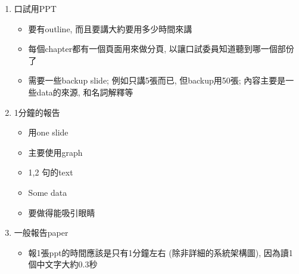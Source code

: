 
\begin{enumerate}
  \item
  {
    口試用PPT
    \begin{itemize}
      \item
      {
        要有outline, 而且要講大約要用多少時間來講
      } %

      \item
      {
        每個chapter都有一個頁面用來做分頁, 以讓口試委員知道聽到哪一個部份了
      } %

      \item
      {
        需要一些backup slide; 例如只講5張而已, 但backup用50張; 內容主要是一些data的來源, 和名詞解釋等
      } %
    \end{itemize}
  } %

  \item
  {
      1分鐘的報告
    \begin{itemize}
      \item
      {
        用one slide
      } %

      \item
      {
        主要使用graph
      } %

      \item
      {
        1,2 句的text
      } %

      \item
      {
        Some data
      } %

      \item
      {
        要做得能吸引眼睛
      } %
    \end{itemize}
  } %

  \item
  {
    一般報告paper
    \begin{itemize}
      \item
      {
        報1張ppt的時間應該是只有1分鐘左右 (除非詳細的系統架構圖), 因為讀1個中文字大約0.3秒
      } %


\end{itemize}}
\end{enumerate}
